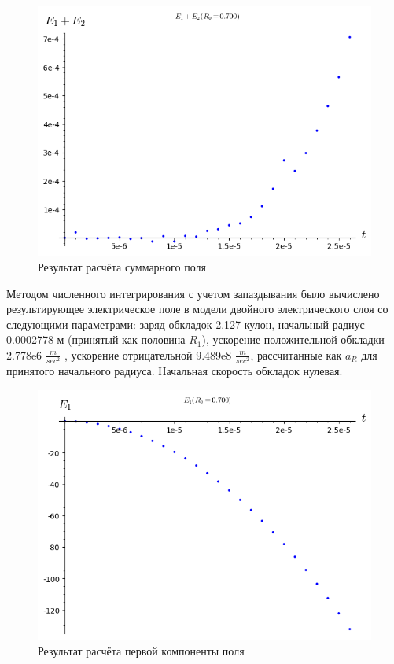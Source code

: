 \documentclass[12pt]{article}
\begin{document}
\begin{figure}
    \centering
    \includegraphics[scale=0.3]{spherical_explosion_E12_t_R0=0_700}
    \caption{Результат расчёта суммарного поля}
    \label{fig:spherical_explosion_E12_t_R0=0_700}
\end{figure}

Методом численного интегрирования с учетом запаздывания было вычислено результирующее электрическое поле в модели двойного электрического слоя со следующими параметрами: заряд обкладок 2.127 кулон,  начальный радиус 0.0002778 м (принятый как половина  ${R}_{1}$), ускорение положительной обкладки 2.778e6 $\frac{m}{sec^2}$ , ускорение отрицательной 9.489e8  $\frac{m}{sec^2}$, рассчитанные как ${a}_{R}$  для принятого начального радиуса. Начальная скорость обкладок нулевая.


\begin{figure}
    \centering
    \includegraphics[scale=0.3]{spherical_explosion_E1_t_R0=0_700}
    \caption{Результат расчёта первой компоненты поля}
    \label{fig:spherical_explosion_E1_t_R0=0_700}
\end{figure}
\end{document}
